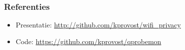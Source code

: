 \documentclass{beamer}
\begin{document}

  \begin{frame}
    \frametitle{Referenties}
    \begin{itemize}
        \item Presentatie: \url{http://github.com/kprovost/wifi_privacy}
        \item Code: \url{https://github.com/kprovost/qprobemon}
    \end{itemize}
  \end{frame}
\end{document}
